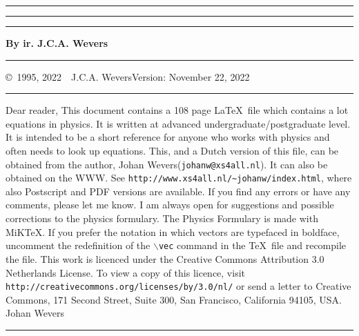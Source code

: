 \documentclass[twoside]{report}
\makeatletter
\newlength{\@x}
\makeatother
\begin{document}
\thispagestyle{empty}
\setcounter{page}{0}
\hrule
\rule{.4pt}{22.85cm}\hspace*{154mm}\rule{.4pt}{22.85cm}
\vspace*{-18cm}
\begin{center}
\Huge
{}
\end{center}
\vspace{2cm}
\centerline{\Large\bf By ir. J.C.A. Wevers}
\vspace*{2cm}
\vfill
\hrule
\newpage
\thispagestyle{empty}
\copyright~1995, 2022~~J.C.A. Wevers\hfill Version: November 22, 2022
\npar
\hrule
\par
\bigskip
Dear reader,
\npar
This document contains a 108 page \LaTeX\ file which contains a lot equations
in physics. It is written at advanced undergraduate/postgraduate level. It is
intended to be a short reference for anyone who works with physics and often
needs to look up equations.
\npar
This, and a Dutch version of this file, can be obtained from the author,
Johan Wevers\linebreak ({\tt johanw@xs4all.nl}).
\npar
It can also be obtained on the WWW. See
{\tt http://www.xs4all.nl/\~{}johanw/index.html}, where also Postscript
and PDF versions are available.
\npar
If you find any errors or have any comments, please let me know. I am always
open for suggestions and possible corrections to the physics formulary.
\npar
The Physics Formulary is made with MiK\TeX.
\npar
If you prefer the notation in which
vectors are typefaced in boldface, uncomment the redefinition of the
{\tt $\backslash$vec} command in the \TeX\ file and recompile the file.
\npar
This work is licenced under the Creative Commons Attribution 3.0 Netherlands License.
To view a copy of this licence, visit {\tt http://creativecommons.org/licenses/by/3.0/nl/} or send
a letter to Creative Commons, 171 Second Street, Suite 300, San Francisco, California 94105, USA.
\npar
Johan Wevers
\vfill
\hrule
\newpage

\tableofcontents
\newpage

\end{document}
